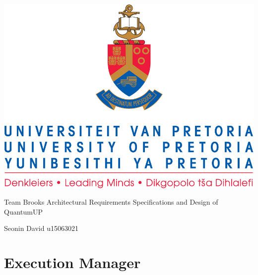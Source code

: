 \documentclass[]{article}
\begin{document}
\selectfont
	\begin{center}\thispagestyle{empty}
		\includegraphics{uplogo.jpg}
		
		{\Huge 
			Team Brooks \linebreak
			Architectural Requirements Specifications and Design of QuantumUP \linebreak 
			\par}
		 
        
        \begin{LARGE}
            Seonin David u15063021
            \linebreak
            \linebreak
         
            \linebreak
            \linebreak
         
            \linebreak
            \linebreak
       
            \linebreak
            \linebreak
           
        \end{LARGE}
    \end{center}
    
    \newpage
	\tableofcontents
	\newpage
	\clearpage
	
    \section{Execution Manager}
    
    \newpage
    
\end{document}
